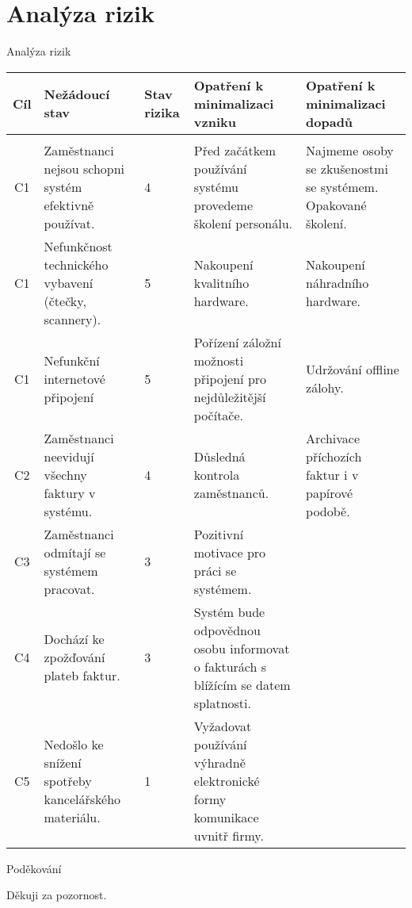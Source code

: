 \documentclass[10pt]{beamer}
\begin{document}
\section{Analýza rizik}
\begin{frame}{Analýza rizik}
\scriptsize 
\begin{tabular}{| c | p{7em} | p{2em} |  p{10em} | p{10em}|}
\hline
  Cíl & \raggedright Nežádoucí stav  &  Stav rizika & Opatření k minimalizaci vzniku &  Opatření k minimalizaci dopadů \\  \hline & & & & \\[-1em] \hline
  
 C1 & \tiny Zaměstnanci nejsou schopni systém efektivně používat. & 4 & \tiny Před začátkem používání systému provedeme školení personálu. & \tiny Najmeme osoby se zkušenostmi se systémem. Opakované školení. \\ \hline
 C1  & \tiny Nefunkčnost technic\-kého vybavení (čtečky, scannery). & 5 & \tiny Nakoupení kvalitního hardware. & \tiny Nakoupení náhradního hardware.  \\ \hline
 C1  & \tiny Nefunkční internetové připojení  & 5 & \tiny Pořízení záložní možnosti připojení pro nejdůležitější počítače. & \tiny Udržování offline zálohy. \\ \hline
 C2  & \tiny Zaměstnanci neevidují všechny faktury v systému. & 4 & \tiny Důsledná kontrola zaměstnanců. & \tiny Archivace příchozích faktur i v papírové podobě. \\ \hline
 C3  & \tiny Zaměstnanci odmítají se systémem pracovat. & 3 & \tiny Pozitivní motivace pro práci se systémem. & \tiny  \\ \hline
 C4  & \tiny Dochází ke zpožďování plateb faktur. & 3 & \tiny Systém bude odpovědnou osobu informovat o fakturách s blížícím se datem splatnosti. & \tiny  \\ \hline
 C5  & \tiny Nedošlo ke snížení spotřeby kancelářského materiálu. & 1 & \tiny Vyžadovat používání výhradně elektronické formy komunikace uvnitř firmy. & \tiny \\ \hline

\end{tabular}
\end{frame}

\begin{frame}{Poděkování}
	\begin{block}{Děkuji za pozornost.}
	\end{block}
\end{frame}
\end{document}
